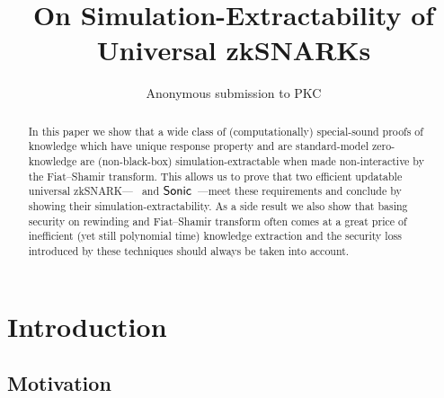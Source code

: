 \let\accentvec\vec \documentclass[runningheads]{llncs}
\title{On Simulation-Extractability of Universal zkSNARKs}
\author{Anonymous submission to PKC}
\begin{document}
 \sloppy \maketitle

\begin{abstract} 
	In this paper we show that a wide class of (computationally) special-sound
	proofs of knowledge which have unique response property and are
	standard-model zero-knowledge are (non-black-box) simulation-extractable
	when made non-interactive by the Fiat--Shamir transform.  This allows us to
	prove that two efficient updatable universal
	zkSNARK---\plonk{}~\cite{EPRINT:GabWilCio19} and
	${\textnormal{\textsf{Sonic}}}$~\cite{CCS:MBKM19}---meet these requirements and conclude by
	showing their simulation-extractability.  As a side result we also show that
	basing security on rewinding and Fiat--Shamir transform often comes at a
	great price of inefficient (yet still polynomial time) knowledge extraction
	and the security loss introduced by these techniques should always be taken
	into account. 
\end{abstract}

\section{Introduction} 
\subsection{Motivation} 
\end{document}
